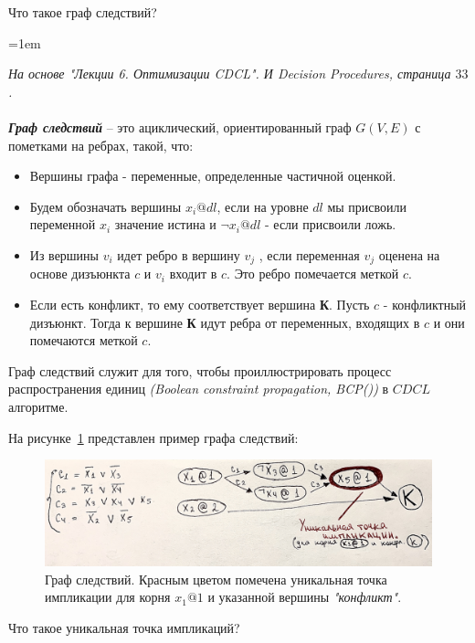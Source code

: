 \documentclass[12pt]{extreport}
\theoremstyle{definiton}
\theoremstyle{definition}
\theoremstyle{definition}
\newcommand{\solution}[2][\color{myblue}Ответ]{
\medskip
	\noindent{\bfseries #1 }{{\color{myblue}\bfseries #2:}}
}
\newenvironment{blockquote}{%
  \par%
  \medskip
  \leftskip=1em%
  \noindent}{%
  \par\medskip}
\begin{document}
\Pr[\textcolor{mygreen}{Саит, DONE}] Что такое граф следствий?
			
\solution{12}
\begin{blockquote}
{\color{myblue}
\textcolor{mypurpur}{\textit{На основе "Лекции 6. Оптимизации CDCL". И Decision Procedures, страница $33$.}}\\
\\
\noindent \textbf{\textit{Граф следствий}} -- это ациклический, ориентированный граф $G(V, E)$ с пометками на ребрах, такой, что:
\begin{itemize}
    \item Вершины графа - переменные, определенные частичной оценкой.
    \item Будем обозначать вершины $x_i @ dl$, если на уровне $dl$ мы присвоили переменной $x_i$ значение истина и $\neg{x_i} @ dl$ - если присвоили ложь.
    \item Из вершины $v_i$ идет ребро в вершину $v_j$ , если переменная $v_j$ оценена на основе дизъюнкта $c$ и $v_i$ входит в $c$. Это ребро помечается меткой $c$.
    \item Если есть конфликт, то ему соответствует вершина \textbf{К}. Пусть $c$ - конфликтный дизъюнкт. Тогда к вершине \textbf{К} идут ребра от переменных, входящих в $c$ и они помечаются меткой $c$.
\end{itemize}

Граф следствий служит для того, чтобы проиллюстрировать процесс распространения единиц \textit{(Boolean constraint propagation, BCP())} в $CDCL$ алгоритме.

На рисунке~\ref{ris:graph_cdcl} представлен пример графа следствий:
\begin{figure}[H]
    \centering
    \includegraphics[width=16.5cm]{images/graph_cdcl.JPG}
    \caption{Граф следствий. Красным цветом помечена уникальная точка импликации для корня $x_1 @ 1$ и указанной вершины \textit{"конфликт"}.}
    \label{ris:graph_cdcl}
\end{figure}
}
\end{blockquote}

\Pr[\textcolor{mygreen}{Алтана, DONE}] Что такое уникальная точка импликаций?
			
\end{document}
